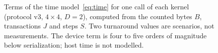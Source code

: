 \begin{figure}[t]
  \centering
  
  \caption{Terms of the time model~\eqref{eq:time} for one call of each
  kernel (protocol v3, $4\times4$, $D=2$), computed from the counted bytes
  $B$, transactions $J$ and steps $S$. Two turnaround values are scenarios,
  not measurements. The device term is four to five orders of magnitude
  below serialization; host time is not modelled.}
  \label{fig:time}
\end{figure}
